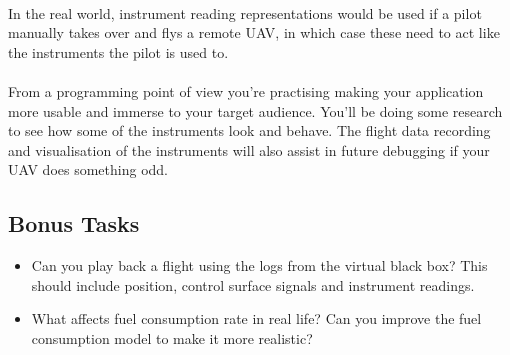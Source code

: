 \documentclass[11pt]{book}
\begin{document}
\paragraph{} In the real world, instrument reading representations would be used if a pilot manually takes over and flys a remote UAV, in which case these need to act like the instruments the pilot is used to. 

\paragraph{} From a programming point of view you're practising making your application more usable and immerse to your target audience. You'll be doing some research to see how some of the instruments look and behave. The flight data recording and visualisation of the instruments will also assist in future debugging if your UAV does something odd.

\subsection{Bonus Tasks}

\begin{itemize}
\item Can you play back a flight using the logs from the virtual black box? This should include position, control surface signals and instrument readings.
\item What affects fuel consumption rate in real life? Can you improve the fuel consumption model to make it more realistic?
\end{itemize}
\end{document}
